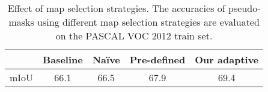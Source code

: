 \begin{table}[]
\centering

{\small
\begin{tabular}{@{}ccccc@{}}
\toprule
                            & Baseline  & Na\"ive   & Pre-defined   & Our adaptive \\ \midrule
\multicolumn{1}{l}{mIoU}    &66.1       & 66.5      & 67.9          & 69.4   \\ \bottomrule
\end{tabular}
}
\vspace{2mm}
\caption{Effect of map selection strategies. The accuracies of pseudo-masks using different map selection strategies are evaluated on the PASCAL VOC 2012 train set.} \vspace{-2mm}
\label{tab:strategy}
\end{table}
